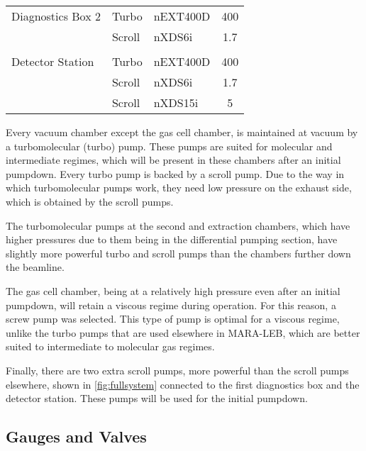\begin{table}[h!]
\begin{tabular}{@{}lllc@{}}
                                                            \\
    Diagnostics Box 2   & Turbo     & nEXT400D      & 400   \\
                        & Scroll    & nXDS6i        & 1.7   \\
                                                            \\
    Detector Station    & Turbo     & nEXT400D      & 400   \\
                        & Scroll    & nXDS6i        & 1.7   \\
                        & Scroll    & nXDS15i       & 5     \\
    \hline
    \end{tabular}
 \end{table}

Every vacuum chamber except the gas cell chamber, is maintained at vacuum by a turbomolecular (turbo) pump. These pumps are suited for molecular and intermediate regimes, which will be present in these chambers after an initial pumpdown. Every turbo pump is backed by a scroll pump. Due to the way in which turbomolecular pumps work, they need low pressure on the exhaust side, which is obtained by the scroll pumps.

The turbomolecular pumps at the second and extraction chambers, which have higher pressures due to them being in the differential pumping section, have slightly more powerful turbo and scroll pumps than the chambers further down the beamline.

The gas cell chamber, being at a relatively high pressure even after an initial pumpdown, will retain a viscous regime during operation. For this reason, a screw pump was selected. This type of pump is optimal for a viscous regime, unlike the turbo pumps that are used elsewhere in MARA-LEB, which are better suited to intermediate to molecular gas regimes.

Finally, there are two extra scroll pumps, more powerful than the scroll pumps elsewhere, shown in \autoref{fig:fullsystem} connected to the first diagnostics box and the detector station. These pumps will be used for the initial pumpdown.


\subsection{Gauges and Valves}
\label{subsec:gaugesandvalves}




